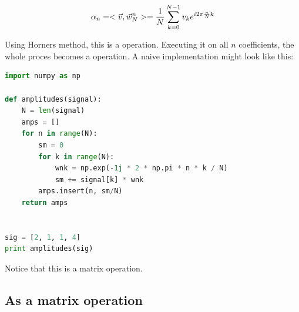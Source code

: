 $$ \alpha_n = < \vec{v} , \vec{w}_N^n > = \frac{1}{N} \sum_{k=0}^{N-1} v_k e^{i 2\pi \frac{n}{N} k} $$

Using Horners method, this is a  operation. Executing it on all $n$ coefficients, the whole proces becomes a  operation. A naive implementation might look like this: 

\begin{lstlisting}[language=python]
import numpy as np

def amplitudes(signal):
    N = len(signal)
    amps = []
    for n in range(N):
        sm = 0
        for k in range(N):
            wnk = np.exp(-1j * 2 * np.pi * n * k / N) 
            sm += signal[k] * wnk
        amps.insert(n, sm/N)
    return amps


sig = [2, 1, 1, 4]
print amplitudes(sig)
\end{lstlisting}

Notice that this is a matrix operation. 


\subsection{As a matrix operation}

